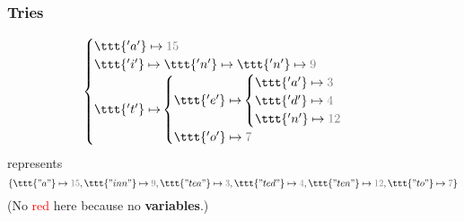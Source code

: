 \begin{frame}
\frametitle{Tries}
\[
\begin{cases}
   \ttt{'a'} \mapsto \textcolor{gray}{15} \\
   \ttt{'i'} \mapsto \ttt{'n'} \mapsto \ttt{'n'} \mapsto \textcolor{gray}{9} \\
   \textcolor{black}{\ttt{'t'} \mapsto}
   \begin{cases}
      \textcolor{black}{\ttt{'e'} \mapsto}
      \begin{cases}
          \ttt{'a'} \mapsto \textcolor{gray}{3} \\
          \ttt{'d'} \mapsto \textcolor{gray}{4} \\
          \textcolor{black}{\ttt{'n'} \mapsto \textcolor{gray}{12}}
      \end{cases} \\
      \ttt{'o'} \mapsto \textcolor{gray}{7}
   \end{cases}
\end{cases}
\]
represents
\[\{
\ttt{"a"} \mapsto \textcolor{gray}{15},
\ttt{"inn"} \mapsto \textcolor{gray}{9},
\ttt{"tea"} \mapsto \textcolor{gray}{3},
\ttt{"ted"} \mapsto \textcolor{gray}{4},
\ttt{"ten"} \mapsto \textcolor{gray}{12},
\ttt{"to"} \mapsto \textcolor{gray}{7}
\}\]
(No \textcolor{red}{red} here because no \textbf{variables}.)
\end{frame}
